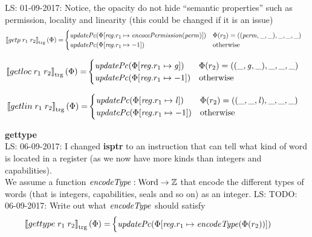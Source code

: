 \documentclass[a4paper]{article}
\newcommand\lau[1]{{\color{purple} \sf \footnotesize {LS: #1}}\\}
\newcommand{\sem}[1]{\left\llbracket #1 \right\rrbracket}
\newcommand{\tsem}[2][\Phi]{\sem{#2}_{\mathrm{trg}}(#1)}
\newcommand{\totherwise}{\text{otherwise }}
\newcommand{\targetcolor}[1]{\color{black}}
\newcommand{\trg}[1]{{\targetcolor{} #1}}
\newcommand{\zinstr}[1]{#1}
\newcommand{\twoinstr}[3]{
  \ifthenelse{\equal{#2#3}{}}
  {\zinstr{#1}}
  {\zinstr{#1} \; #2 \; #3}
}
\newcommand{\tisptr}[2]{\twoinstr{\trg{gettype}}{#1}{#2}}
\newcommand{\tgetp}[2]{\twoinstr{\trg{getp}}{#1}{#2}}
\newcommand{\tgetloc}[2]{\twoinstr{\trg{getloc}}{#1}{#2}}
\newcommand{\tgetlin}[2]{\twoinstr{\trg{getlin}}{#1}{#2}}
\newcommand{\ints}{\mathbb{Z}}
\newcommand{\update}[2]{[#1 \mapsto #2]}
\newcommand{\updReg}[2]{\update{\reg.#1}{#2}}
\newcommand{\shareddom}[1]{\mathrm{#1}}
\newcommand{\Word}{\shareddom{Word}}
\newcommand{\perm}{\var{perm}}
\newcommand{\gl}{\var{g}}
\newcommand{\lin}{\var{l}}
\newcommand{\var}[1]{\mathit{#1}}
\newcommand{\reg}{\var{reg}}
\newcommand{\plainfun}[2]{
  \ifthenelse{\equal{#2}{}}
  {\mathit{#1}}
  {\mathit{#1}(#2)}
}
\newcommand{\encType}[1]{\plainfun{encodeType}{#1}}
\newcommand{\encPerm}[1]{\plainfun{encocePermission}{#1}}
\newcommand{\updPcAddr}[1]{\plainfun{updatePc}{#1}}
\begin{document}
\lau{01-09-2017: Notice, the opacity do not hide ``semantic properties'' such as permission, locality and linearity (this could be changed if it is an issue)}

\begin{align*}
  \tsem{\tgetp{r_1}{r_2}} = & 
                              \begin{cases}
                                \updPcAddr{}(\Phi\update{\reg.r_1}{\encPerm{\perm}}) & \Phi(r_2) = ((\perm,\_,\_),\_,\_,\_)\\
                                \updPcAddr{\Phi\updReg{r_1}{-1}} & \totherwise
                              \end{cases}
\end{align*}

\begin{align*}
  \tsem{\tgetloc{r_1}{r_2}} = &                              
                              \begin{cases}
                                \updPcAddr{}(\Phi\update{\reg.r_1}{\gl}) & \Phi(r_2) = ((\_,\gl,\_),\_,\_,\_) \\
                                \updPcAddr{\Phi\updReg{r_1}{-1}} & \totherwise
                              \end{cases}
\end{align*}

\begin{align*}
  \tsem{\tgetlin{r_1}{r_2}} = &                              
                              \begin{cases}
                                \updPcAddr{}(\Phi\update{\reg.r_1}{\lin}) & \Phi(r_2) = ((\_,\_,\lin),\_,\_,\_) \\
                                \updPcAddr{\Phi\updReg{r_1}{-1}} & \totherwise
                              \end{cases}
\end{align*}

\textbf{gettype}\\
\lau{06-09-2017: I changed \textbf{isptr} to an instruction that can tell what kind of word is located in a register (as we now have more kinds than integers and capabilities).}
We assume a function $\encType{} : \Word \rightarrow \ints$ that encode the different types of words (that is integers, capabilities, seals and so on) as an integer.
\lau{TODO: 06-09-2017: Write out what $\encType{}$ should satisfy}
\begin{align*}
  \tsem{\tisptr{r_1}{r_2}} = & 
                               \begin{cases}
                                 \updPcAddr{}(\Phi\updReg{r_1}{\encType{\Phi(r_2)}})
                               \end{cases}
\end{align*}
\end{document}
